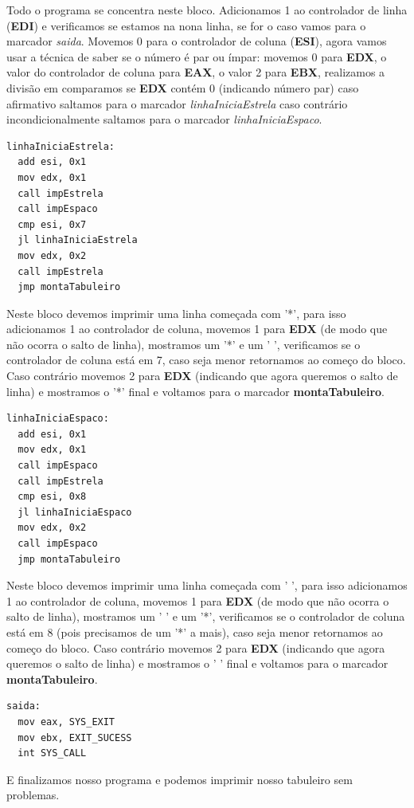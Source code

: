 Todo o programa se concentra neste bloco. Adicionamos 1 ao controlador de linha (\textbf{EDI}) e verificamos se estamos na nona linha, se for o caso vamos para o marcador \textit{saida}. Movemos 0 para o controlador de coluna (\textbf{ESI}), agora vamos usar a técnica de saber se o número é par ou ímpar: movemos 0 para \textbf{EDX}, o valor do controlador de coluna para \textbf{EAX}, o valor 2 para \textbf{EBX}, realizamos a divisão em comparamos se \textbf{EDX} contém 0 (indicando número par) caso afirmativo saltamos para o marcador \textit{linhaIniciaEstrela} caso contrário incondicionalmente saltamos para o marcador \textit{linhaIniciaEspaco}.

\begin{lstlisting}[]
linhaIniciaEstrela:
  add esi, 0x1
  mov edx, 0x1
  call impEstrela 
  call impEspaco
  cmp esi, 0x7
  jl linhaIniciaEstrela
  mov edx, 0x2
  call impEstrela 
  jmp montaTabuleiro	
\end{lstlisting}

Neste bloco devemos imprimir uma linha começada com '*', para isso adicionamos 1 ao controlador de coluna, movemos 1 para \textbf{EDX} (de modo que não ocorra o salto de linha), mostramos um '*' e um ' ', verificamos se o controlador de coluna está em 7, caso seja menor retornamos ao começo do bloco. Caso contrário movemos 2 para \textbf{EDX} (indicando que agora queremos o salto de linha) e mostramos o '*' final e voltamos para o marcador \textbf{montaTabuleiro}.

\begin{lstlisting}[]
linhaIniciaEspaco:
  add esi, 0x1
  mov edx, 0x1
  call impEspaco
  call impEstrela 
  cmp esi, 0x8
  jl linhaIniciaEspaco
  mov edx, 0x2
  call impEspaco 
  jmp montaTabuleiro	
\end{lstlisting}

Neste bloco devemos imprimir uma linha começada com ' ', para isso adicionamos 1 ao controlador de coluna, movemos 1 para \textbf{EDX} (de modo que não ocorra o salto de linha), mostramos um ' ' e um '*', verificamos se o controlador de coluna está em 8 (pois precisamos de um '*' a mais), caso seja menor retornamos ao começo do bloco. Caso contrário movemos 2 para \textbf{EDX} (indicando que agora queremos o salto de linha) e mostramos o ' ' final e voltamos para o marcador \textbf{montaTabuleiro}.

\begin{lstlisting}[]
saida:
  mov eax, SYS_EXIT
  mov ebx, EXIT_SUCESS
  int SYS_CALL	
\end{lstlisting}

E finalizamos nosso programa e podemos imprimir nosso tabuleiro sem problemas.

\clearpage